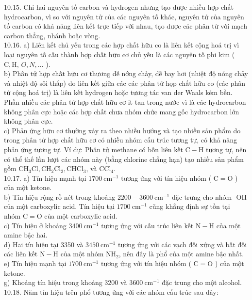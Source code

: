 \documentclass[10pt]{article}
\begin{document}
10.15. Chỉ hai nguyên tố carbon và hydrogen nhưng tạo được nhiều hợp chất hydrocarbon, vì so với nguyên tử của các nguyên tố khác, nguyên tử của nguyên tố carbon có khả năng liên kết trực tiếp với nhau, tạo được các phân tử với mạch carbon thẳng, nhánh hoặc vòng.\\
10.16. a) Liên kết chủ yếu trong các hợp chất hữu co là liên kết cộng hoá trị vì loại nguyên tố cấu thành hợp chất hữu cơ chủ yếu là các nguyên tố phi kim ( $\mathrm{C}, \mathrm{H}$, $O, N, \ldots$ ).\\
b) Phân tử hợp chất hữu cơ thương dễ nớng chảy, dễ bay hơi (nhiệt độ nóng chảy và nhiệt độ sôi thấp) do liên kết giữa các các phân tử họp chất hữu co (các phân tử cộng hoá trị) là liên kết hydrogen hoặc tương tác van der Waals kém bền. Phần nhiều các phân tử hợp chất hữu cơ it tan trong nước vì là các hydrocarbon không phân cực hoặc các hợp chất chưa nhóm chức mang gốc hydrocarbon lớn không phân cực.\\
c) Phản ứng hữu cơ thường xảy ra theo nhiều hướng và tạo nhiều sản phẩm do trong phân tử hợp chất hữu cơ có nhiều nhóm cấu trúc tương tự, có khả năng phản ứng tương tự. Ví dự: Phân tử methane có bốn liên kết $\mathrm{C}-\mathrm{H}$ tương tự, nên có thể thế lần lượt các nhóm này (bằng chlorine chẳng hạn) tạo nhiều sản phẩm gồm $\mathrm{CH}_{3} \mathrm{Cl}, \mathrm{CH}_{2} \mathrm{Cl}_{2}, \mathrm{CHCl}_{3}$, và $\mathrm{CCl}_{4}$.\\
10.17. a) Tín hiệu mạnh tại $1700 \mathrm{~cm}^{-1}$ tương ứng với tín hiệu nhóm ( $\mathrm{C}=\mathrm{O}$ ) của một ketone.\\
b) Tín hiệu rộng rỗ nét trong khoảng $2200-3600 \mathrm{~cm}^{-1}$ đặc trưng cho nhóm -OH của một carboxylic acid. Tín hiệu tại $1700 \mathrm{~cm}^{-1}$ cũng khẳng định sự tồn tại nhóm $\mathrm{C}=\mathrm{O}$ của một carboxylic acid.\\
c) Tín hiệu ở khoảng $3400 \mathrm{~cm}^{-1}$ tương ứng với cấu trúc liên kết $\mathrm{N}-\mathrm{H}$ của một amine bậc hai.\\
d) Hai tín hiệu tại 3350 và $3450 \mathrm{~cm}^{-1}$ tương ứng với các vạch đối xứng và bất đối các liên kết $\mathrm{N}-\mathrm{H}$ của một nhóm $\mathrm{NH}_{2}$, nên đây là phổ của một amine bậc nhất.\\
e) Tín hiệu mạnh tại $1700 \mathrm{~cm}^{-1}$ tương ứng với tín hiệu nhóm ( $\mathrm{C}=\mathrm{O}$ ) của một ketone.\\
g) Khoảng tín hiệu trong khoảng 3200 và $3600 \mathrm{~cm}^{-1}$ đặc trung cho một alcohol.\\
10.18. Năm tín hiệu trên phổ tương ứng với các nhóm cấu trúc sau đây:
\end{document}
